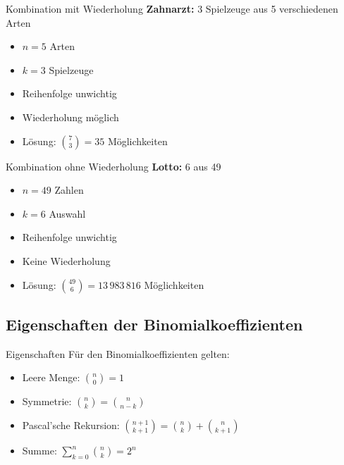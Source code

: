 \begin{example2}{Kombination mit Wiederholung}
\textbf{Zahnarzt:} 3 Spielzeuge aus 5 verschiedenen Arten
\begin{itemize}
    \item $n=5$ Arten
    \item $k=3$ Spielzeuge
    \item Reihenfolge unwichtig
    \item Wiederholung möglich
    \item Lösung: $\binom{7}{3} = 35$ Möglichkeiten
\end{itemize}
\end{example2}

\begin{example2}{Kombination ohne Wiederholung}
\textbf{Lotto:} 6 aus 49
\begin{itemize}
    \item $n=49$ Zahlen
    \item $k=6$ Auswahl
    \item Reihenfolge unwichtig
    \item Keine Wiederholung
    \item Lösung: $\binom{49}{6} = 13\,983\,816$ Möglichkeiten
\end{itemize}
\end{example2}

\subsection{Eigenschaften der Binomialkoeffizienten}

\begin{theorem}{Eigenschaften}
Für den Binomialkoeffizienten gelten:
\begin{itemize}
    \item Leere Menge: $\binom{n}{0} = 1$
    \item Symmetrie: $\binom{n}{k} = \binom{n}{n-k}$
    \item Pascal'sche Rekursion: $\binom{n+1}{k+1} = \binom{n}{k} + \binom{n}{k+1}$
    \item Summe: $\sum_{k=0}^n \binom{n}{k} = 2^n$
\end{itemize}
\end{theorem}

